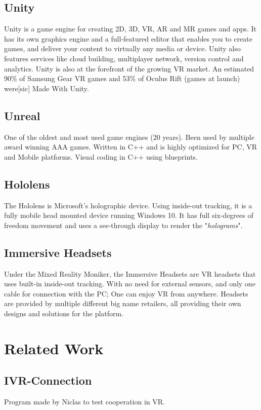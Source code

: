     \subsection{Unity}
    Unity is a game engine for creating 2D, 3D, VR, AR and MR games and apps. It has its own graphics engine and a full-featured editor that enables you to create games, and deliver your content to virtually any media or device. Unity also features services like cloud building, multiplayer network, version control and analytics. Unity is also at the forefront of the growing VR market. An estimated 90\% of Samsung Gear VR games and 53\% of Oculus Rift (games at launch) were[sic] Made With Unity. \cite{UnityAbout}
    
    \subsection{Unreal}
    One of the oldest and most used game engines (20 years). Been used by multiple award winning AAA games. Written in C++ and is highly optimized for PC, VR and Mobile platforms.
    Visual coding in C++ using blueprints.

    \subsection{Hololens}
    The Hololens is Microsoft's holographic device. Using inside-out tracking, it is a fully mobile head mounted device running Windows 10. It has full six-degrees of freedom movement and uses a see-through display to render the "\emph{holograms}".

    \subsection{Immersive Headsets}
    Under the Mixed Reality Moniker, the Immersive Headsets are VR headsets that uses built-in inside-out tracking. With no need for external sensors, and only one cable for connection with the PC; One can enjoy VR from anywhere. Headsets are provided by multiple different big name retailers, all providing their own designs and solutions for the platform.

\section{Related Work}
    
    \subsection{IVR-Connection}
    Program made by Niclas to test cooperation in VR.
    
